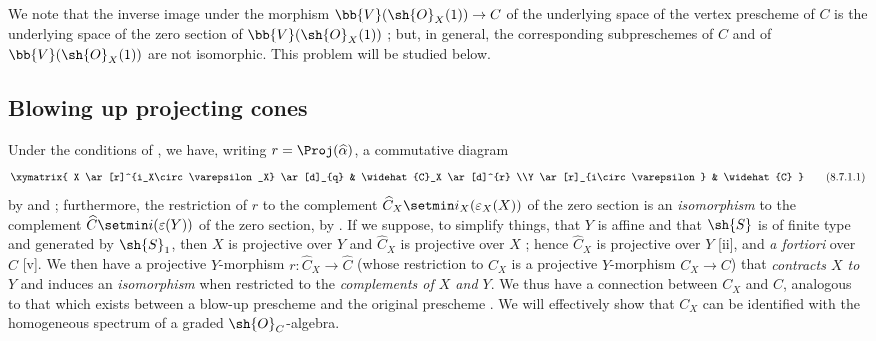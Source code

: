 We note that the inverse image under the morphism $\bb{V}(\sh{O}_X(1))\to C$ of the underlying space of the vertex prescheme of $C$ is the underlying space of the zero section of $\bb{V}(\sh{O}_X(1))$ ;
but, in general, the corresponding subpreschemes of $C$ and of $\bb{V}(\sh{O}_X(1))$ are not isomorphic.
This problem will be studied below.


\subsection{Blowing up projecting cones}
\label{subsection:II.8.7}

\begin{env}[8.7.1]
\label{II.8.7.1}
Under the conditions of , we have, writing $r=\Proj(\widehat{\alpha})$, a commutative diagram
\[
\label{II.8.7.1.1}
  \xymatrix{
    X
      \ar[r]^{i_X\circ\varepsilon_X}
      \ar[d]_{q}
  & \widehat{C}_X
      \ar[d]^{r}
  \\Y
      \ar[r]_{i\circ\varepsilon}
  & \widehat{C}
  }
\tag{8.7.1.1}
\]
by  and ;
furthermore, the restriction of $r$ to the complement $\widehat{C}_X\setmin i_X(\varepsilon_X(X))$ of the zero section is an \emph{isomorphism} to the complement $\widehat{C}\setmin i(\varepsilon(Y))$ of the zero section, by .
If we suppose, to simplify things, that $Y$ is affine and that $\sh{S}$ is of finite type and generated by $\sh{S}_1$, then $X$ is projective over $Y$ and $\widehat{C}_X$ is projective over $X$ ; hence $\widehat{C}_X$ is projective over $Y$ [ii], and \emph{a fortiori} over $\widehat{C}$ [v].
We then have a projective $Y$-morphism $r:\widehat{C}_X\to\widehat{C}$ (whose restriction to $C_X$ is a projective $Y$-morphism $C_X\to C$) that \emph{contracts $X$ to $Y$} and induces an \emph{isomorphism} when restricted to the \emph{complements of $X$ and $Y$}.
We thus have a connection between $C_X$ and $C$, analogous to that which exists between a blow-up prescheme and the original prescheme .
We will effectively show that $C_X$ can be identified with the homogeneous spectrum of a graded $\sh{O}_C$-algebra.
\end{env}

